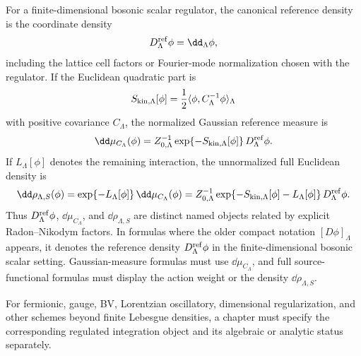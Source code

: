 \begin{definition}
\label{def:regulated-scalar-integration-conventions}
For a finite-dimensional bosonic scalar regulator, the canonical reference
density is the coordinate density
\[
  D_\Lambda^{\rm ref}\phi=\dd_\Lambda\phi ,
\]
including the lattice cell factors or Fourier-mode normalization chosen with
the regulator.  If the Euclidean quadratic part is
\[
  S_{\rm kin,\Lambda}[\phi]
  =
  \frac12\langle\phi,C_\Lambda^{-1}\phi\rangle_\Lambda
\]
with positive covariance \(C_\Lambda\), the normalized Gaussian reference
measure is
\begin{equation}
  \dd\mu_{C_\Lambda}(\phi)
  =
  Z_{0,\Lambda}^{-1}
  \exp\{-S_{\rm kin,\Lambda}[\phi]\}\,
  D_\Lambda^{\rm ref}\phi .
  \label{eq:gaussian-reference-measure-from-density}
\end{equation}
If \(L_\Lambda[\phi]\) denotes the remaining interaction, the unnormalized full
Euclidean density is
\begin{equation}
  \dd\rho_{\Lambda,S}(\phi)
  =
  \exp\{-L_\Lambda[\phi]\}\,\dd\mu_{C_\Lambda}(\phi)
  =
  Z_{0,\Lambda}^{-1}
  \exp\{-S_{\rm kin,\Lambda}[\phi]-L_\Lambda[\phi]\}\,
  D_\Lambda^{\rm ref}\phi .
  \label{eq:full-density-reference-versus-gaussian}
\end{equation}
Thus \(D_\Lambda^{\rm ref}\phi\), \(\dd\mu_{C_\Lambda}\), and
\(\dd\rho_{\Lambda,S}\) are distinct named objects related by explicit
Radon--Nikodym factors.  In formulas where the older compact notation
\([D\phi]_\Lambda\) appears, it denotes the reference density
\(D_\Lambda^{\rm ref}\phi\) in the finite-dimensional bosonic scalar setting.
Gaussian-measure formulas must use \(\dd\mu_{C_\Lambda}\), and full
source-functional formulas must display the action weight or the density
\(\dd\rho_{\Lambda,S}\).

For fermionic, gauge, BV, Lorentzian oscillatory, dimensional regularization,
and other schemes beyond finite Lebesgue densities, a chapter must specify the
corresponding regulated integration object and its algebraic or analytic
status separately.
\end{definition}

